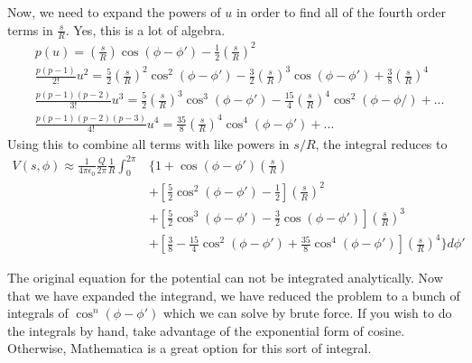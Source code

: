 \documentclass[a4paper, 11pt]{article}
\newenvironment{solution}{%
	\begin{list}{}{%
			\setlength{\topsep}{0pt}%
			\setlength{\leftmargin}{0.5cm}%
			\setlength{\rightmargin}{0.5cm}%
			\setlength{\listparindent}{\parindent}%
			\setlength{\itemindent}{\parindent}%
			\setlength{\parsep}{\parskip}%
		}%
		\item[]}{\end{list}}
\begin{document}
\begin{solution}
  \noindent Now, we need to expand the powers of $u$ in order to find all of the fourth
  order terms in $\frac{s}{R}$. Yes, this is a lot of algebra. 
  \begin{align}
    &p(u) =  \left( \frac{s}{R} \right)\cos(\phi-\phi')-\frac{1}{2}\left( \frac{s}{R} \right)^2\\
    &\frac{p(p-1)}{2!}u^2 = \frac{5}{2}\left( \frac{s}{R} \right)^2\cos^2(\phi-\phi')-\frac{3}{2}\left( \frac{s}{R} \right)^3\cos(\phi-\phi')+\frac{3}{8}\left( \frac{s}{R} \right)^4 \\
    & \frac{p(p-1)(p-2)}{3!}u^3 = \frac{5}{2}\left( \frac{s}{R} \right)^3\cos^3(\phi-\phi')-\frac{15}{4}\left( \frac{s}{R} \right)^4\cos^2(\phi-\phi/) +...\\
    & \frac{p(p-1)(p-2)(p-3)}{4!}u^4 = \frac{35}{8}\left( \frac{s}{R} \right)^4\cos^4(\phi-\phi')+...
  \end{align}
  Using this to combine all terms with like powers in $s/R$, the integral reduces to
  \begin{equation}
    \begin{split}
      V(s,\phi)\approx\frac{1}{4\pi\epsilon_0}\frac{Q}{2\pi}\frac{1}{R}\int_0^{2\pi}&\Bigg\{ 1+\cos(\phi-\phi')\left( \frac{s}{R} \right)\\
      &+ \left[ \frac{5}{2}\cos^2(\phi-\phi')-\frac{1}{2}  \right]\left( \frac{s}{R} \right)^2\\
      &+ \left[ \frac{5}{2}\cos^3(\phi-\phi')-\frac{3}{2}\cos(\phi-\phi')    \right]\left( \frac{s}{R} \right)^3\\
      &+ \left[ \frac{3}{8}-\frac{15}{4}\cos^2(\phi-\phi')+\frac{35}{8}\cos^4(\phi-\phi') \right]\left( \frac{s}{R} \right)^4  \Bigg\}d\phi'
    \end{split}
  \end{equation}

  \noindent The original equation for the potential can not be integrated analytically.
  Now that we have expanded the integrand, we have reduced the problem to a
  bunch of integrals of $\cos^n(\phi-\phi')$ which we can solve by 
  brute force. If you wish to do the integrals by hand, take advantage of the
  exponential form of cosine. Otherwise, Mathematica is a great option for this
  sort of integral. \\



\end{solution}
\end{document}
